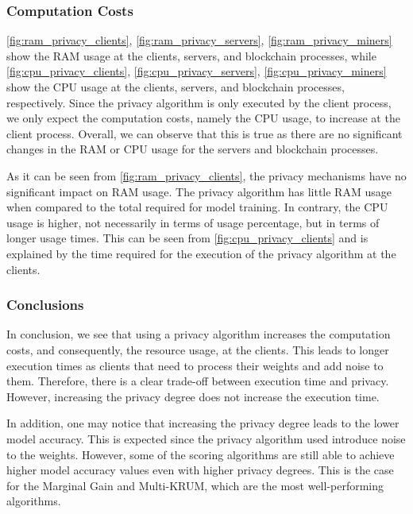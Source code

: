 \subsubsection{Computation Costs}

\autoref{fig:ram_privacy_clients}, \autoref{fig:ram_privacy_servers}, \autoref{fig:ram_privacy_miners} show the RAM usage at the clients, servers, and blockchain processes, while \autoref{fig:cpu_privacy_clients}, \autoref{fig:cpu_privacy_servers}, \autoref{fig:cpu_privacy_miners} show the CPU usage at the clients, servers, and blockchain processes, respectively. Since the privacy algorithm is only executed by the client process, we only expect the computation costs, namely the CPU usage, to increase at the client process. Overall, we can observe that this is true as there are no significant changes in the RAM or CPU usage for the servers and blockchain processes.

As it can be seen from \autoref{fig:ram_privacy_clients}, the privacy mechanisms have no significant impact on RAM usage. The privacy algorithm has little RAM usage when compared to the total required for model training. In contrary, the CPU usage is higher, not necessarily in terms of usage percentage, but in terms of longer usage times. This can be seen from \autoref{fig:cpu_privacy_clients} and is explained by the time required for the execution of the privacy algorithm at the clients.

\subsubsection{Conclusions}

In conclusion, we see that using a privacy algorithm increases the computation costs, and consequently, the resource usage, at the clients. This leads to longer execution times as clients that need to process their weights and add noise to them. Therefore, there is a clear trade-off between execution time and privacy. However, increasing the privacy degree does not increase the execution time.

In addition, one may notice that increasing the privacy degree leads to the lower model accuracy. This is expected since the privacy algorithm used introduce noise to the weights. However, some of the scoring algorithms are still able to achieve higher model accuracy values even with higher privacy degrees. This is the case for the Marginal Gain and Multi-KRUM, which are the most well-performing algorithms.

